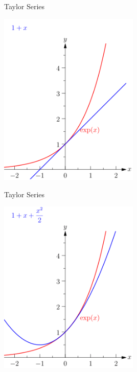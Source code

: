 \documentclass{beamer}
\begin{document}
\begin{frame}{Taylor Series}
      \begin{center}

    \includegraphics[width=0.5\textwidth, height=\textheight, keepaspectratio]{Mfnf-exp-series-imageonline.co-60931-3.png}
  \end{center}
    
\end{frame}
\begin{frame}{Taylor Series}
      \begin{center}

    \includegraphics[width=0.5\textwidth, height=\textheight, keepaspectratio]{Mfnf-exp-series-imageonline.co-60931-4.png}
  \end{center}
    
\end{frame}
\end{document}
